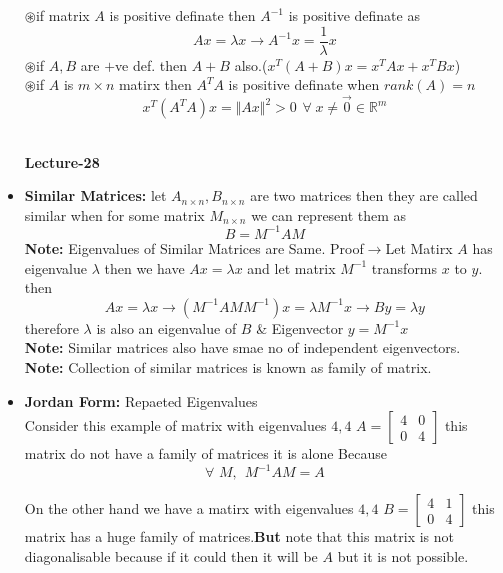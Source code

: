\documentclass[a4paper,11pt]{article}
\numberwithin{equation}{section}
\begin{document}
\begin{itemize}
$\circledast$if matrix $A$ is positive definate then $A^{-1}$ is positive definate as\[Ax=\lambda x \longrightarrow A^{-1}x=\frac{1}{\lambda} x\]
$\circledast$if $A,B$ are $+$ve def. then $A+B$ also.($x^T(A+B)x=x^TAx+x^TBx$)\\

$\circledast$if $A$ is $m\times n$ matirx then $A^TA$ is positive definate when $rank(A)=n$\[x^T(A^TA)x=\Vert Ax\Vert^2>0 \hspace{5pt} \forall \hspace{3pt}x\neq \vec{0}\in \mathbb{R}^m\]\\
\begin{center}
    \Huge{\textbf{Lecture-28}}
\end{center}
\vspace{5pt}
\item \textbf{Similar Matrices:} let $A_{n\times n},B_{n\times n}$ are two matrices then they are called similar when for some matrix $M_{n\times n}$ we can represent them as\[B=M^{-1}AM\]
\textbf{Note:} Eigenvalues of Similar Matrices are Same. Proof$\rightarrow$Let Matirx $A$ has eigenvalue $\lambda$ then we have $Ax=\lambda x$ and let matrix $M^{-1}$ transforms $x$ to $y$. then
\[Ax=\lambda x \longrightarrow (M^{-1}AMM^{-1})x=\lambda M^{-1}x \longrightarrow By=\lambda y\]
therefore $\lambda$ is also an eigenvalue of $B$ \& Eigenvector $y=M^{-1}x$\\

\textbf{Note:} Similar matrices also have smae no of independent eigenvectors.\\
\textbf{Note:} Collection of similar matrices is known as family of matrix.

\item \textbf{Jordan Form:} Repaeted Eigenvalues \\

Consider this example of matrix with eigenvalues $4,4$ $A=\begin{bmatrix}
    4&0\\0&4
\end{bmatrix}$ this matrix do not have a family of matrices it  is alone Because \[\forall\hspace{4pt} M, \hspace{5pt}M^{-1}AM=A\]

On the other hand we have a matirx with eigenvalues $4,4$ $B=\begin{bmatrix}
    4&1\\0&4
\end{bmatrix}$ this matrix has a huge family of matrices.\textbf{But} note that this matrix is not diagonalisable because if it could then it will be $A$ but it is not possible.\\


\end{itemize}
\end{document}
